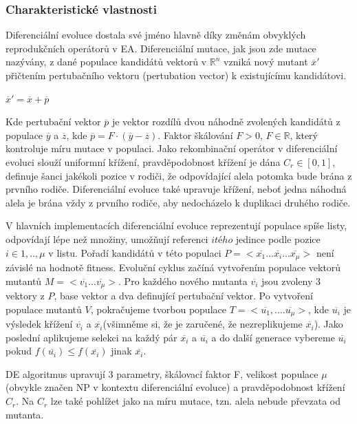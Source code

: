 \subsubsection{Charakteristické vlastnosti}
Diferenciální evoluce dostala své jméno hlavně díky změnám obvyklých reprodukčních operátorů v EA. Diferenciální mutace, jak jsou zde mutace nazývány, z dané populace kandidátů vektorů v $\mathbb{R}^n$ vzniká nový mutant $\overline{x}'$ přičtením pertubačního vektoru (pertubation vector) k existujícímu kandidátovi. \par
$\overline{x}'=\overline{x}+\overline{p}$
\par
Kde pertubační vektor $\overline{p}$ je vektor rozdílů dvou náhodně zvolených kandidátů z populace $\overline{y}$ a $\overline{z}$, kde $\overline{p}=F \cdot (\overline{y}-\overline{z})$.
 Faktor škálování $F > 0$, $F \in \mathbb{R}$, který kontroluje míru mutace v populaci. Jako rekombinační operátor v diferenciální evoluci slouží uniformní křížení, pravděpodobnost křížení je dána $C_r \in [0,1]$, definuje šanci jakékoli pozice v rodiči, že odpovídající alela potomka bude brána z prvního rodiče. Diferenciální evoluce také upravuje křížení, neboť jedna náhodná alela je brána vždy z prvního rodiče, aby nedocházelo k duplikaci druhého rodiče. \par 
V hlavních implementacích diferenciální evoluce reprezentují populace spíše listy, odpovídají lépe než množiny, umožňují referenci $itého$ jedince podle pozice $i\in{1, .., \mu}$ v listu. Pořadí kandidátů v této populaci $P=<\overline{x_1}...\overline{x_i}...\overline{x_{\mu}}>$ není závislé na hodnotě fitness. Evoluční cyklus začíná vytvořením populace vektorů mutantů $M=<\overline{v_1}...\overline{v_{\mu}}>$. Pro každého nového mutanta $\overline{v_i}$ jsou zvoleny 3 vektory z $P$, base vektor a dva definující pertubační vektor. Po vytvoření populace mutantů $V$, pokračujeme tvorbou populace $T=<\overline{u_1},....\overline{u_{\mu}}>$, kde $\overline{u_i}$ je výsledek křížení $\overline{v_i}$ a $\overline{x_i}$(všimněme si, že je zaručené, že nezreplikujeme $\overline{x_i}$). Jako poslední aplikujeme selekci na každý pár $\overline{x_i}$ a $\overline{u_i}$ a do další generace vybereme $\overline{u_i}$ pokud $f(\overline{u_i}) \leq f(\overline{x_i})$ jinak $\overline{x_i}$. \par 
DE algoritmus upravují 3 parametry, škálovací faktor F, velikost populace $\mu$ (obvykle značen NP v kontextu diferenciální evoluce) a pravděpodobnost křížení $C_r$. Na $C_r$ lze také pohlížet jako na míru mutace, tzn. alela nebude převzata od mutanta.\par

